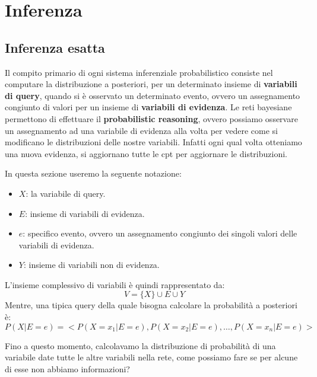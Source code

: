 \section{Inferenza}
\subsection{Inferenza esatta}
Il compito primario di ogni sistema inferenziale probabilistico consiste nel
computare la distribuzione a posteriori, per un determinato insieme di \textbf{variabili
    di query}, quando si è osservato un determinato evento, ovvero un assegnamento
congiunto di valori per un insieme di \textbf{variabili di evidenza}.
Le reti bayesiane permettono di effettuare il \textbf{probabilistic reasoning}, ovvero
possiamo osservare un assegnamento ad una variabile di evidenza alla volta per 
vedere come si modificano le distribuzioni delle nostre variabili. Infatti ogni 
qual volta otteniamo una nuova evidenza, si aggiornano tutte le cpt per aggiornare 
le distribuzioni.

In questa sezione useremo la seguente notazione:
\begin{itemize}
    \item $X$: la variabile di query.
    \item $E$: insieme di variabili di evidenza.
    \item $e$: specifico evento, ovvero un assegnamento congiunto dei singoli
          valori delle variabili di evidenza.
    \item $Y$: insieme di variabili non di evidenza.
\end{itemize}
L'insieme complessivo di variabili è quindi rappresentato da:
\begin{equation*}
    V = \{X\} \cup E \cup Y
\end{equation*}
Mentre, una tipica query della quale bisogna calcolare la probabilità a
posteriori è:
\begin{equation*}
    P(X|E=e) = <P(X=x_1|E=e), P(X=x_2|E=e), \dots, P(X=x_n|E=e)>
\end{equation*}

Fino a questo momento, calcolavamo la distribuzione di probabilità di una
variabile date tutte le altre variabili nella rete, come possiamo fare se per
alcune di esse non abbiamo informazioni?

